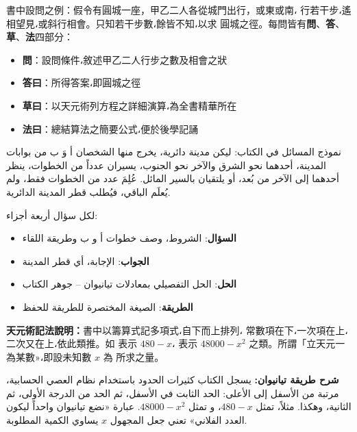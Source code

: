 \documentclass[11pt,a4paper]{article}
\newcommand{\tianyuan}[2]{\raisebox{-0.6ex}{\scriptsize$\begin{array}{c}#1\\\hline #2\end{array}$}}
\begin{document}
\noindent
\begin{minipage}[t]{0.48\textwidth}
書中設問之例：假令有圓城一座，甲乙二人各從城門出行，或東或南،
行若干步،遙相望見،或斜行相會。只知若干步數،餘皆不知،以求
圓城之徑。每問皆有\textbf{問}、\textbf{答}、\textbf{草}、\textbf{法}四部分：
\begin{itemize}[leftmargin=1.5em]
  \item \textbf{問}：設問條件،敘述甲乙二人行步之數及相會之狀
  \item \textbf{答曰}：所得答案،即圓城之徑
  \item \textbf{草曰}：以天元術列方程之詳細演算،為全書精華所在
  \item \textbf{法曰}：總結算法之簡要公式،便於後學記誦
\end{itemize}
\end{minipage}
\hfill
\begin{minipage}[t]{0.48\textwidth}
\arabicfont\beginR
نموذج المسائل في الكتاب: ليكن مدينة دائرية، يخرج منها الشخصان
أ وَ ب من بوابات المدينة، أحدهما نحو الشرق والآخر نحو الجنوب،
يسيران عدداً من الخطوات، ينظر أحدهما إلى الآخر من بُعد، أو
يلتقيان بالسير المائل. عُلِمَ عدد من الخطوات فقط، ولم يُعلَم
الباقي، فيُطلب قطر المدينة الدائرية.

لكل سؤال أربعة أجزاء:
\begin{itemize}[leftmargin=1.5em]
  \item \textbf{السؤال}: الشروط، وصف خطوات أ و ب وطريقة اللقاء
  \item \textbf{الجواب}: الإجابة، أي قطر المدينة
  \item \textbf{الحل}: الحل التفصيلي بمعادلات تيانيوان -- جوهر الكتاب
  \item \textbf{الطريقة}: الصيغة المختصرة للطريقة للحفظ
\end{itemize}
\endR
\end{minipage}

\vspace{0.5cm}

\noindent
\begin{minipage}[t]{0.48\textwidth}
\textbf{天元術記法說明：}書中以籌算式記多項式،自下而上排列،
常數項在下،一次項在上،二次又在上،依此類推。如
\tianyuan{480}{1}表示 $480 - x$،\tianyuan{0\quad0\quad48000}{1\quad0\quad0}
表示 $48000 - x^2$ 之類。所謂「立天元一為某數»،即設未知數 $x$ 為
所求之量。
\end{minipage}
\hfill
\begin{minipage}[t]{0.48\textwidth}
\arabicfont\beginR
\textbf{شرح طريقة تيانيوان:} يسجل الكتاب كثيرات الحدود باستخدام
نظام العصي الحسابية، مرتبة من الأسفل إلى الأعلى: الحد الثابت
في الأسفل، ثم الحد من الدرجة الأولى، ثم الثانية، وهكذا.
مثلاً، \tianyuan{480}{1} تمثل $480 - x$، و
\tianyuan{0\quad0\quad48000}{1\quad0\quad0} تمثل
$48000 - x^2$. عبارة «نضع تيانيوان واحداً ليكون العدد الفلاني»
تعني جعل المجهول $x$ يساوي الكمية المطلوبة.
\endR
\end{minipage}
\end{document}
